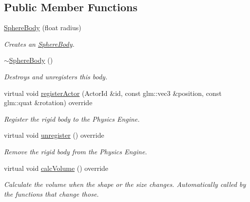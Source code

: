 \subsection*{Public Member Functions}
\begin{DoxyCompactItemize}
\item 
\hyperlink{classTarbora_1_1SphereBody_a35e582dfbc4660cb796360ceec62e168}{Sphere\+Body} (float radius)
\begin{DoxyCompactList}\small\item\em Creates an \hyperlink{classTarbora_1_1SphereBody}{Sphere\+Body}. \end{DoxyCompactList}\item 
\mbox{\label{classTarbora_1_1SphereBody_a4592aa7dad4a13f33839f4883f21654b}} 
\hyperlink{classTarbora_1_1SphereBody_a4592aa7dad4a13f33839f4883f21654b}{$\sim$\+Sphere\+Body} ()
\begin{DoxyCompactList}\small\item\em Destroys and unregisters this body. \end{DoxyCompactList}\item 
virtual void \hyperlink{classTarbora_1_1SphereBody_aa4a13d5e547bac9cb9fa30405517de2c}{register\+Actor} (Actor\+Id \&id, const glm\+::vec3 \&position, const glm\+::quat \&rotation) override
\begin{DoxyCompactList}\small\item\em Register the rigid body to the Physics Engine. \end{DoxyCompactList}\item 
\mbox{\label{classTarbora_1_1SphereBody_a65741975df1d4f37a1cf203e7453dbbe}} 
virtual void \hyperlink{classTarbora_1_1SphereBody_a65741975df1d4f37a1cf203e7453dbbe}{unregister} () override
\begin{DoxyCompactList}\small\item\em Remove the rigid body from the Physics Engine. \end{DoxyCompactList}\item 
\mbox{\label{classTarbora_1_1SphereBody_a47e3ba2b62a9156392e4b704e436a792}} 
virtual void \hyperlink{classTarbora_1_1SphereBody_a47e3ba2b62a9156392e4b704e436a792}{calc\+Volume} () override
\begin{DoxyCompactList}\small\item\em Calculate the volume when the shape or the size changes. Automatically called by the functions that change those. \end{DoxyCompactList}\item 

\end{DoxyCompactItemize}
